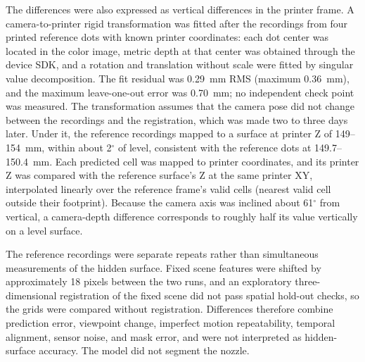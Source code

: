The differences were also expressed as vertical differences in the printer frame. A camera-to-printer rigid transformation was fitted after the recordings from four printed reference dots with known printer coordinates: each dot center was located in the color image, metric depth at that center was obtained through the device SDK, and a rotation and translation without scale were fitted by singular value decomposition. The fit residual was 0.29~mm RMS (maximum 0.36~mm), and the maximum leave-one-out error was 0.70~mm; no independent check point was measured. The transformation assumes that the camera pose did not change between the recordings and the registration, which was made two to three days later. Under it, the reference recordings mapped to a surface at printer Z of 149--154~mm, within about 2$^\circ$ of level, consistent with the reference dots at 149.7--150.4~mm. Each predicted cell was mapped to printer coordinates, and its printer Z was compared with the reference surface's Z at the same printer XY, interpolated linearly over the reference frame's valid cells (nearest valid cell outside their footprint). Because the camera axis was inclined about 61$^\circ$ from vertical, a camera-depth difference corresponds to roughly half its value vertically on a level surface.

The reference recordings were separate repeats rather than simultaneous measurements of the hidden surface. Fixed scene features were shifted by approximately 18 pixels between the two runs, and an exploratory three-dimensional registration of the fixed scene did not pass spatial hold-out checks, so the grids were compared without registration. Differences therefore combine prediction error, viewpoint change, imperfect motion repeatability, temporal alignment, sensor noise, and mask error, and were not interpreted as hidden-surface accuracy. The model did not segment the nozzle.

